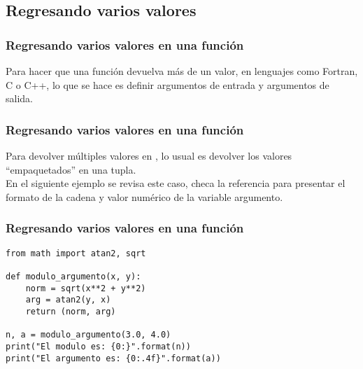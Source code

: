 \documentclass[12pt]{beamer}
\begin{document}
\subsection{Regresando varios valores}

\begin{frame}[fragile]
\frametitle{Regresando varios valores en una función}
Para hacer que una función devuelva más de un valor, en lenguajes como Fortran, C o C++, lo que se hace es definir argumentos de entrada y argumentos de salida.
\end{frame}
\begin{frame}[fragile]
\frametitle{Regresando varios valores en una función}
Para devolver múltiples valores en \python, lo usual es devolver los valores \enquote{empaquetados} en una tupla.
\\
\bigskip
\pause
En el siguiente ejemplo se revisa este caso, checa la referencia para presentar el formato de la cadena y valor numérico de la variable argumento.
\end{frame}
\begin{frame}[fragile]
\frametitle{Regresando varios valores en una función}
\begin{lstlisting}[caption=Devolviendo varios valores, basicstyle=\linespread{1.2}\ttfamily\small, columns=fullflexible,escapeinside=||]
from math import atan2, sqrt

def modulo_argumento(x, y):
    norm = sqrt(x**2 + y**2)
    arg = atan2(y, x)
    return (norm, arg)
    
n, a = modulo_argumento(3.0, 4.0)
print("El modulo es: {0:}".format(n))
print("El argumento es: {0:.4f}".format(a))
\end{lstlisting}
\end{frame}
\end{document}
